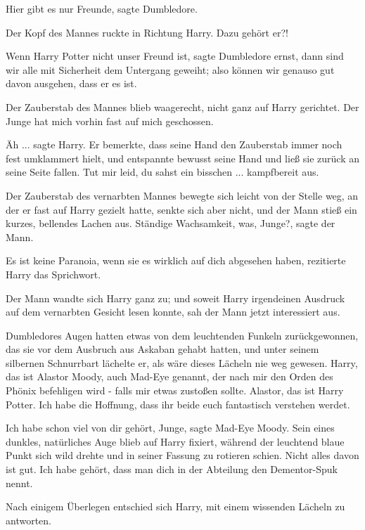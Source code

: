 \glqq{}Hier gibt es nur Freunde\grqq{}, sagte Dumbledore.

Der Kopf des Mannes ruckte in Richtung Harry. \glqq{}Dazu gehört er?!\grqq{}

\glqq{}Wenn Harry Potter nicht unser Freund ist\grqq{}, sagte Dumbledore ernst,
\glqq{}dann sind wir alle mit Sicherheit dem Untergang geweiht; also können wir
genauso gut davon ausgehen, dass er es ist.\grqq{}

Der Zauberstab des Mannes blieb waagerecht, nicht ganz auf Harry gerichtet.
\glqq{}Der Junge hat mich vorhin fast auf mich geschossen.\grqq{}

\glqq{}Äh ...\grqq{} sagte Harry. Er bemerkte, dass seine Hand den Zauberstab
immer noch fest umklammert hielt, und entspannte bewusst seine Hand und ließ sie
zurück an seine Seite fallen. \glqq{}Tut mir leid, du sahst ein bisschen ...
kampfbereit aus.\grqq{}

Der Zauberstab des vernarbten Mannes bewegte sich leicht von der Stelle weg, an
der er fast auf Harry gezielt hatte, senkte sich aber nicht, und der Mann stieß
ein kurzes, bellendes Lachen aus. \glqq{}Ständige Wachsamkeit, was,
Junge?\grqq{}, sagte der Mann.

\glqq{}Es ist keine Paranoia, wenn sie es wirklich auf dich abgesehen
haben\grqq{}, rezitierte Harry das Sprichwort.

Der Mann wandte sich Harry ganz zu; und soweit Harry irgendeinen Ausdruck auf
dem vernarbten Gesicht lesen konnte, sah der Mann jetzt interessiert aus.

Dumbledores Augen hatten etwas von dem leuchtenden Funkeln zurückgewonnen, das
sie vor dem Ausbruch aus Askaban gehabt hatten, und unter seinem silbernen
Schnurrbart lächelte er, als wäre dieses Lächeln nie weg gewesen. \glqq{}Harry,
das ist Alastor Moody, auch Mad-Eye genannt, der nach mir den Orden des Phönix
befehligen wird - falls mir etwas zustoßen sollte. Alastor, das ist Harry
Potter. Ich habe die Hoffnung, dass ihr beide euch fantastisch verstehen
werdet.\grqq{}

\glqq{}Ich habe schon viel von dir gehört, Junge\grqq{}, sagte Mad-Eye Moody.
Sein eines dunkles, natürliches Auge blieb auf Harry fixiert, während der
leuchtend blaue Punkt sich wild drehte und in seiner Fassung zu rotieren schien.
\glqq{}Nicht alles davon ist gut. Ich habe gehört, dass man dich in der Abteilung
den Dementor-Spuk nennt.\grqq{}

Nach einigem Überlegen entschied sich Harry, mit einem wissenden Lächeln zu
antworten.

